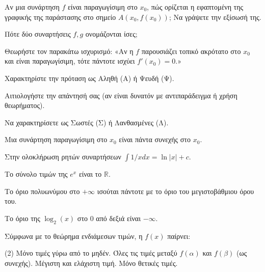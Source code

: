 \documentclass[11pt,a4paper]{article}
\newcommand{\kerkissans}[1]{{\fontfamily{maksf}\selectfont \textbf{#1}}}
\renewcommand{\textdexiakeraia}{}
\newcommand\themanum{A}
\newcounter{thema}[section]
\renewcommand{\thethema}{\arabic{thema}}
\newcommand{\Thema}{\refstepcounter{thema}{\textbf{\textcolor{black}{\faPenSquare\ \  \large \kerkissans{\textbf{\thethemaο\hspace{2mm}Διαγώνισμα - Θέμα \themanum}}}}}\hspace{0mm}}{}
\newenvironment{thema}[1]
{\begin{tcolorbox}[title=\Thema\kerkissans{\textbf{\large{  #1}}},breakable,
enhanced standard,titlerule=0pt,toprule=0pt, rightrule=0pt, bottomrule=0pt,
colback=white,left=0mm,top=1mm,bottom=0mm,
boxrule=0pt,
colframe=white,leftrule=0mm,sharp corners,coltitle=black]
\renewcommand{\themanum}{#1}}
{\end{tcolorbox}}
\begin{document}
\begin{thema}{A}
\begin{erwthma}
    \item Αν μια συνάρτηση $f$ είναι παραγωγίσιμη στο $x_0$, πώς ορίζεται η εφαπτομένη της γραφικής της παράστασης στο σημείο $A(x_0, f(x_0))$; Να γράψετε την εξίσωσή της.
    \item Πότε δύο συναρτήσεις $f, g$ ονομάζονται ίσες;
    \item Θεωρήστε τον παρακάτω ισχυρισμό:
    «Αν η $f$ παρουσιάζει τοπικό ακρότατο στο $x_0$ και είναι παραγωγίσιμη, τότε πάντοτε ισχύει $f'(x_0)=0$.»
    \begin{alist}
    \item Χαρακτηρίστε την πρόταση ως Αληθή (Α) ή Ψευδή (Ψ).
    \item Αιτιολογήστε την απάντησή σας (αν είναι δυνατόν με αντιπαράδειγμα ή χρήση θεωρήματος).
    \end{alist}
    \item Να χαρακτηρίσετε ως Σωστές (Σ) ή Λανθασμένες (Λ).
    \begin{alist}
        \item Μια συνάρτηση παραγωγίσιμη στο $x_0$ είναι πάντα συνεχής στο $x_0$.
        \item Στην ολοκλήρωση ρητών συναρτήσεων $\int 1/x dx = \ln|x| + c$.
        \item Το σύνολο τιμών της $e^x$ είναι το $\mathbb{R}$.
        \item Το όριο πολυωνύμου στο $+\infty$ ισούται πάντοτε με το όριο του μεγιστοβάθμιου όρου του.
        \item Το όριο της $\log_2(x)$ στο 0 από δεξιά είναι $-\infty$.
    \end{alist}
    \item Σύμφωνα με το θεώρημα ενδιάμεσων τιμών, η $f(x)$ παίρνει:
    \begin{tasks}[label=\let\textdexiakeraia\relax\alph*.](2)
        \task Μόνο τιμές γύρω από το μηδέν.
        \task Όλες τις τιμές μεταξύ $f(\alpha)$ και $f(\beta)$ (ως συνεχής).
        \task Μέγιστη και ελάχιστη τιμή.
        \task Μόνο θετικές τιμές.
    \end{tasks}
\end{erwthma}
\end{thema}
\vspace{1cm}
\end{document}

